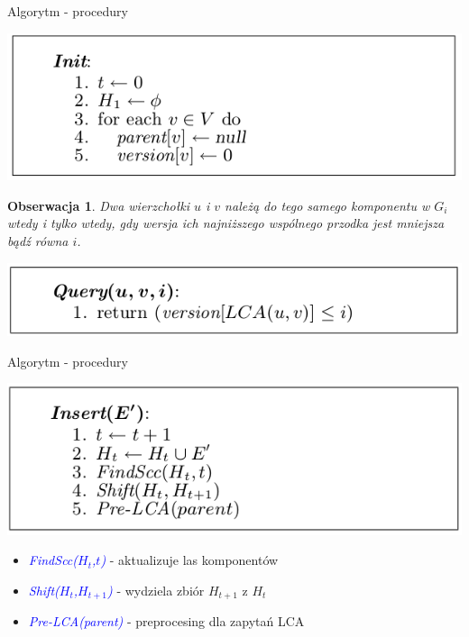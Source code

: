 \documentclass{beamer}
\newtheorem{obs}{Obserwacja}
\newcommand{\emp}[1]{\textcolor{blue}{\textit{#1}}}
\begin{document}
\begin{frame}{Algorytm - procedury}
\begin{center}
\includegraphics[scale=0.4]{img/Init.png}
\end{center}

\begin{obs}
Dwa wierzchołki $u$ i $v$ należą do tego samego komponentu w $G_i$ wtedy i tylko wtedy, gdy wersja ich najniższego wspólnego przodka jest mniejsza bądź równa $i$.
\end{obs}

\begin{center}
\includegraphics[scale=0.4]{img/Query.png}
\end{center}
\end{frame}

\begin{frame}{Algorytm - procedury}
\begin{center}
\includegraphics[scale=0.4]{img/Insert.png}
\end{center}

\begin{itemize}
\item \emp{FindScc($H_t$,$t$)} - aktualizuje las komponentów
\item \emp{Shift($H_t$,$H_{t+1}$)} - wydziela zbiór $H_{t+1}$ z $H_t$
\item \emp{Pre-LCA(parent)} - preprocesing dla zapytań LCA
\end{itemize}
\end{frame}
\end{document}
